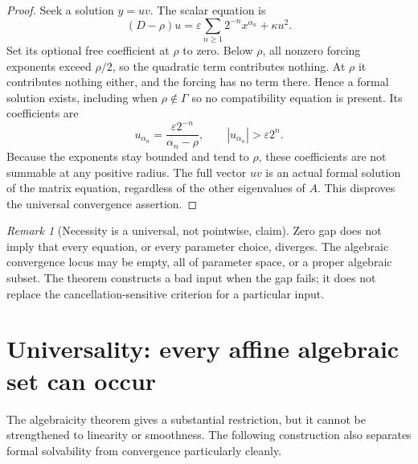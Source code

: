 \documentclass[11pt,a4paper]{article}
\numberwithin{equation}{section}
\theoremstyle{definition}
\theoremstyle{remark}
\newtheorem{remark}[theorem]{Remark}
\newcommand{\G}{\Gamma}
\newcommand{\abs}[1]{\left\lvert #1\right\rvert}
\begin{document}
\begin{proof}
Seek a solution $y=u v$. The scalar equation is
\[
 (D-\rho)u=\varepsilon\sum_{n\geq1}2^{-n}x^{\alpha_n}+\kappa u^2.
\]
Set its optional free coefficient at $\rho$ to zero. Below $\rho$, all
nonzero forcing exponents exceed $\rho/2$, so the quadratic term
contributes nothing. At $\rho$ it contributes nothing either, and the
forcing has no term there. Hence a formal solution exists, including when
$\rho\notin\G$ so no compatibility equation is present. Its coefficients
are
\[
 u_{\alpha_n}=\frac{\varepsilon 2^{-n}}{\alpha_n-\rho},
 \qquad \abs{u_{\alpha_n}}>\varepsilon 2^n.
\]
Because the exponents stay bounded and tend to $\rho$, these coefficients
are not summable at any positive radius. The full vector $uv$ is an
actual formal solution of the matrix equation, regardless of the other
eigenvalues of $A$. This disproves the universal convergence assertion.
\end{proof}

\begin{remark}[Necessity is a universal, not pointwise, claim]
Zero gap does not imply that every equation, or every parameter choice,
diverges. The algebraic convergence locus may be empty, all of parameter
space, or a proper algebraic subset. The theorem constructs a bad input
when the gap fails; it does not replace the cancellation-sensitive
criterion for a particular input.
\end{remark}

\section{Universality: every affine algebraic set can occur}
\label{sec:universality}

The algebraicity theorem gives a substantial restriction, but it cannot
be strengthened to linearity or smoothness. The following construction
also separates formal solvability from convergence particularly cleanly.
\end{document}
